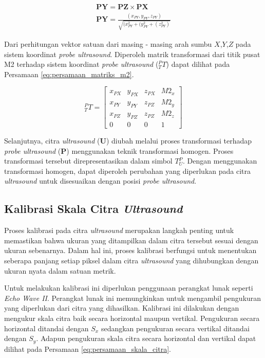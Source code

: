 \begin{equation}
	\begin{align}
		\textbf{PY} = \textbf{PZ} \times \textbf{PX} \\
		\textbf{PY} = \frac{(x_{PY}, y_{PY}, z_{PY})}{\sqrt{{(x_{PY}^2 + (y_{PY}^2 + (z_{PY}^2)}}}
	\end{align}	
	\label{eq:persamaan_py_probe}
\end{equation}

Dari perhitungan vektor satuan dari masing - masing arah sumbu $X$,$Y$,$Z$ pada sistem koordinat \textit{probe ultrasound}. Diperoleh matrik transformasi dari titik pusat M2 terhadap sistem koordinat \textit{probe ultrasound} (${_T^P}T$) dapat dilihat pada Persamaan \ref{eq:persamaan_matriks_m2}.


\begin{equation}
	{_T^P}T = \begin{bmatrix}x_{PX} & y_{PX} & z_{PX} & M2_x  \\x_{PY} & y_{PY} & z_{PZ} & M2_y \\x_{PZ} & y_{PZ} & z_{PZ} & M2_z \\0 & 0 & 0 & 1 \end{bmatrix}	
	\label{eq:persamaan_matriks_m2}
\end{equation}

Selanjutnya, citra \textit{ultrasound} (\textbf{U}) diubah melalui proses transformasi terhadap \textit{probe ultrasound} (\textbf{P}) menggunakan teknik transformasi homogen. Proses transformasi tersebut direpresentasikan dalam simbol $T{_U^P}$. Dengan menggunakan transformasi homogen, dapat diperoleh perubahan yang diperlukan pada citra \textit{ultrasound} untuk disesuaikan dengan posisi \textit{probe ultrasound}.



\subsection{Kalibrasi Skala Citra \textit{Ultrasound}}
Proses kalibrasi pada citra \textit{ultrasound} merupakan langkah penting untuk memastikan bahwa ukuran yang ditampilkan dalam citra tersebut sesuai dengan ukuran sebenarnya. Dalam hal ini, proses kalibrasi berfungsi untuk menentukan seberapa panjang setiap piksel dalam citra \textit{ultrasound} yang dihubungkan dengan ukuran nyata dalam satuan metrik.

Untuk melakukan kalibrasi ini diperlukan penggunaan perangkat lunak seperti \textit{Echo Wave II}. Perangkat lunak ini memungkinkan untuk mengambil pengukuran yang diperlukan dari citra yang dihasilkan. Kalibrasi ini dilakukan dengan mengukur skala citra baik secara horizontal maupun vertikal. Pengukuran secara horizontal ditandai dengan $S_x$ sedangkan pengukuran secara vertikal ditandai dengan $S_y$. Adapun pengukuran skala citra secara horizontal dan vertikal dapat dilihat pada Persamaan \ref{eq:persamaan_skala_citra}.

